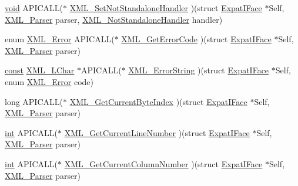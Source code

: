\begin{DoxyCompactItemize}
\item 
\hyperlink{sound_8c_ae35f5844602719cf66324f4de2a658b3}{void} A\+P\+I\+C\+A\+LL($\ast$ \hyperlink{struct_expat_i_face_a237a96b29a1e55836f02bcccfc5b3666}{X\+M\+L\+\_\+\+Set\+Not\+Standalone\+Handler} )(struct \hyperlink{struct_expat_i_face}{Expat\+I\+Face} $\ast$Self, \hyperlink{amiga_2include_2libraries_2expat_8h_a9dc0003156857c67b3a60b3993846013}{X\+M\+L\+\_\+\+Parser} parser, \hyperlink{amiga_2include_2libraries_2expat_8h_a1cadb615cc7347bd076a4eafcaf687fa}{X\+M\+L\+\_\+\+Not\+Standalone\+Handler} handler)
\item 
enum \hyperlink{amiga_2include_2libraries_2expat_8h_a6a06dad2fbbc37dd288c51e577494118}{X\+M\+L\+\_\+\+Error} A\+P\+I\+C\+A\+LL($\ast$ \hyperlink{struct_expat_i_face_ad2c53208191b53f55d42d0c1b3694da3}{X\+M\+L\+\_\+\+Get\+Error\+Code} )(struct \hyperlink{struct_expat_i_face}{Expat\+I\+Face} $\ast$Self, \hyperlink{amiga_2include_2libraries_2expat_8h_a9dc0003156857c67b3a60b3993846013}{X\+M\+L\+\_\+\+Parser} parser)
\item 
\hyperlink{getopt1_8c_a2c212835823e3c54a8ab6d95c652660e}{const} \hyperlink{amiga_2include_2libraries_2expat_8h_a728c9a3114531eaeb70753ba4601c418}{X\+M\+L\+\_\+\+L\+Char} $\ast$A\+P\+I\+C\+A\+LL($\ast$ \hyperlink{struct_expat_i_face_ad55c2849747736ab7d56b52557c7ed82}{X\+M\+L\+\_\+\+Error\+String} )(struct \hyperlink{struct_expat_i_face}{Expat\+I\+Face} $\ast$Self, enum \hyperlink{amiga_2include_2libraries_2expat_8h_a6a06dad2fbbc37dd288c51e577494118}{X\+M\+L\+\_\+\+Error} code)
\item 
long A\+P\+I\+C\+A\+LL($\ast$ \hyperlink{struct_expat_i_face_a6d8850369257e8348552789fb5a92df5}{X\+M\+L\+\_\+\+Get\+Current\+Byte\+Index} )(struct \hyperlink{struct_expat_i_face}{Expat\+I\+Face} $\ast$Self, \hyperlink{amiga_2include_2libraries_2expat_8h_a9dc0003156857c67b3a60b3993846013}{X\+M\+L\+\_\+\+Parser} parser)
\item 
\hyperlink{xmltok_8h_a5a0d4a5641ce434f1d23533f2b2e6653}{int} A\+P\+I\+C\+A\+LL($\ast$ \hyperlink{struct_expat_i_face_af8cd14ded76ebd23daabbd1c1a67cae1}{X\+M\+L\+\_\+\+Get\+Current\+Line\+Number} )(struct \hyperlink{struct_expat_i_face}{Expat\+I\+Face} $\ast$Self, \hyperlink{amiga_2include_2libraries_2expat_8h_a9dc0003156857c67b3a60b3993846013}{X\+M\+L\+\_\+\+Parser} parser)
\item 
\hyperlink{xmltok_8h_a5a0d4a5641ce434f1d23533f2b2e6653}{int} A\+P\+I\+C\+A\+LL($\ast$ \hyperlink{struct_expat_i_face_ac527027081ecfc8361e565a9a969daf7}{X\+M\+L\+\_\+\+Get\+Current\+Column\+Number} )(struct \hyperlink{struct_expat_i_face}{Expat\+I\+Face} $\ast$Self, \hyperlink{amiga_2include_2libraries_2expat_8h_a9dc0003156857c67b3a60b3993846013}{X\+M\+L\+\_\+\+Parser} parser)

\end{DoxyCompactItemize}
